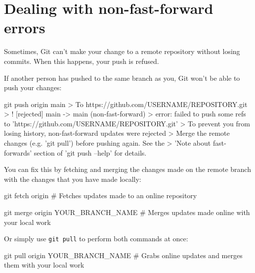 \newpage
\section{Dealing with non-fast-forward errors}

Sometimes, Git can't make your change to a remote repository without losing commits. When this happens, your push is refused. 

If another person has pushed to the same branch as you, Git won't be able to push your changes:
\begin{exampleblock}
    \begin{codeblock}[language=bash]
git push origin main
> To https://github.com/USERNAME/REPOSITORY.git
>  ! [rejected]        main -> main (non-fast-forward)
> error: failed to push some refs to 'https://github.com/USERNAME/REPOSITORY.git'
> To prevent you from losing history, non-fast-forward updates were rejected
> Merge the remote changes (e.g. 'git pull') before pushing again. See the
> 'Note about fast-forwards' section of 'git push --help' for details.
    \end{codeblock}
\end{exampleblock}

You can fix this by fetching and merging the changes made on the remote branch with the changes that you have made locally:
\begin{codeblock}[language=bash]
git fetch origin 
# Fetches updates made to an online repository

git merge origin YOUR_BRANCH_NAME
# Merges updates made online with your local work
\end{codeblock}

Or simply use \texttt{git pull} to perform both commands at once:
\begin{codeblock}[language=bash]
git pull origin YOUR_BRANCH_NAME 
# Grabs online updates and merges them with your local work 
\end{codeblock}